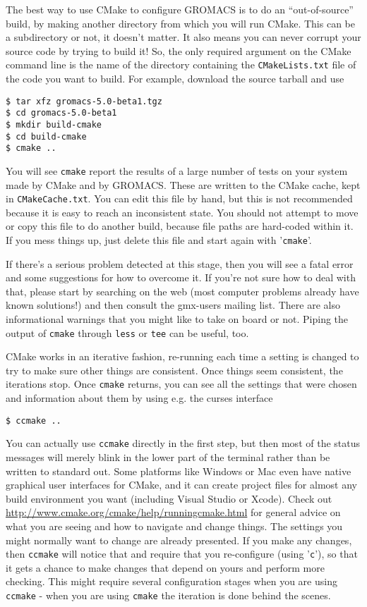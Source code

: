 \documentclass{article}[12pt,a4paper,twoside]
\newcommand{\gromacs}{GROMACS}
\newcommand{\cmake}{CMake}
\begin{document}
The best way to use \cmake{} to configure \gromacs{} is to do an
``out-of-source'' build, by making another directory from which you
will run \cmake{}. This can be a subdirectory or not, it doesn't
matter. It also means you can never corrupt your source code by trying
to build it! So, the only required argument on the \cmake{} command
line is the name of the directory containing the
\verb+CMakeLists.txt+ file of the code you want to build. For
example, download the source tarball and use
\begin{verbatim}
$ tar xfz gromacs-5.0-beta1.tgz
$ cd gromacs-5.0-beta1
$ mkdir build-cmake
$ cd build-cmake
$ cmake ..
\end{verbatim}

You will see \verb+cmake+ report the results of a large number of
tests on your system made by \cmake{} and by \gromacs{}. These are
written to the \cmake{} cache, kept in \verb+CMakeCache.txt+. You
can edit this file by hand, but this is not recommended because it is
easy to reach an inconsistent state. You should not attempt to move or
copy this file to do another build, because file paths are hard-coded
within it. If you mess things up, just delete this file and start
again with '\verb+cmake+'.

If there's a serious problem detected at this stage, then you will see
a fatal error and some suggestions for how to overcome it. If you're
not sure how to deal with that, please start by searching on the web
(most computer problems already have known solutions!) and then
consult the gmx-users mailing list. There are also informational
warnings that you might like to take on board or not. Piping the
output of \verb+cmake+ through \verb+less+ or \verb+tee+ can be
useful, too.

\cmake{} works in an iterative fashion, re-running each time a setting
is changed to try to make sure other things are consistent. Once
things seem consistent, the iterations stop. Once \verb+cmake+
returns, you can see all the settings that were chosen and information
about them by using e.g. the curses interface
\begin{verbatim}
$ ccmake ..
\end{verbatim}
You can actually use \verb+ccmake+ directly in the first step, but then
most of the status messages will merely blink in the lower part
of the terminal rather than be written to standard out. Some platforms
like Windows or Mac even have native graphical user interfaces for
\cmake{}, and it can create project files for almost any build environment
you want (including Visual Studio or Xcode).
Check out \url{http://www.cmake.org/cmake/help/runningcmake.html} for
general advice on what you are seeing and how to navigate and change
things. The settings you might normally want to change are already
presented. If you make any changes, then \verb+ccmake+ will notice
that and require that you re-configure (using '\verb+c+'), so that it
gets a chance to make changes that depend on yours and perform more
checking. This might require several configuration stages when you are
using \verb+ccmake+ - when you are using \verb+cmake+ the
iteration is done behind the scenes.
\end{document}
